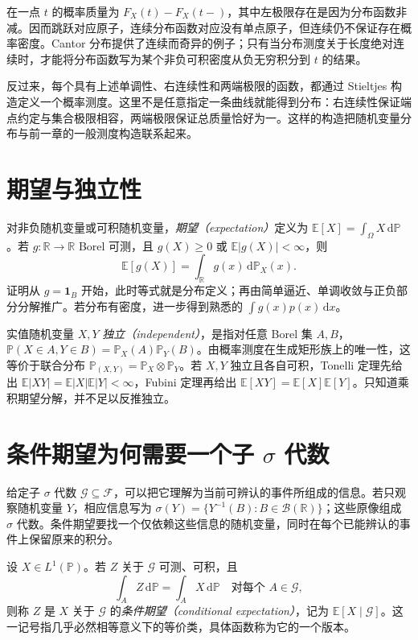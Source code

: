 在一点 $t$ 的概率质量为 $F_X(t)-F_X(t-)$，其中左极限存在是因为分布函数非减。因而跳跃对应原子，连续分布函数对应没有单点原子，但连续仍不保证存在概率密度。Cantor 分布提供了连续而奇异的例子；只有当分布测度关于长度绝对连续时，才能将分布函数写为某个非负可积密度从负无穷积分到 $t$ 的结果。

反过来，每个具有上述单调性、右连续性和两端极限的函数，都通过 Stieltjes 构造定义一个概率测度。这里不是任意指定一条曲线就能得到分布：右连续性保证端点约定与集合极限相容，两端极限保证总质量恰好为一。这样的构造把随机变量分布与前一章的一般测度构造联系起来。

\section{期望与独立性}
对非负随机变量或可积随机变量，\emph{期望（expectation）}定义为 $\mathbb E[X]=\int_\Omega X\,\mathrm d\mathbb P$。若 $g:\mathbb R\to\mathbb R$ Borel 可测，且 $g(X)\geq0$ 或 $\mathbb E|g(X)|<\infty$，则
\begin{equation}
 \mathbb E[g(X)]=\int_{\mathbb R}g(x)\,\mathrm d\mathbb P_X(x).
 \label{eq:mt-distribution-integral}
\end{equation}
证明从 $g=\mathbf1_B$ 开始，此时等式就是分布定义；再由简单逼近、单调收敛与正负部分分解推广。若分布有密度，进一步得到熟悉的 $\int g(x)p(x)\,\mathrm dx$。

实值随机变量 $X,Y$ \emph{独立（independent）}，是指对任意 Borel 集 $A,B$，
$\mathbb P(X\in A,Y\in B)=\mathbb P_X(A)\mathbb P_Y(B)$。由概率测度在生成矩形族上的唯一性，这等价于联合分布 $\mathbb P_{(X,Y)}=\mathbb P_X\otimes\mathbb P_Y$。若 $X,Y$ 独立且各自可积，Tonelli 定理先给出 $\mathbb E|XY|=\mathbb E|X|\mathbb E|Y|<\infty$，Fubini 定理再给出 $\mathbb E[XY]=\mathbb E[X]\mathbb E[Y]$。只知道乘积期望分解，并不足以反推独立。

\section{条件期望为何需要一个子 $\sigma$ 代数}
给定子 $\sigma$ 代数 $\mathcal G\subseteq\mathcal F$，可以把它理解为当前可辨认的事件所组成的信息。若只观察随机变量 $Y$，相应信息写为 $\sigma(Y)=\{Y^{-1}(B):B\in\mathcal B(\mathbb R)\}$；这些原像组成 $\sigma$ 代数。条件期望要找一个仅依赖这些信息的随机变量，同时在每个已能辨认的事件上保留原来的积分。

\begin{definition}
设 $X\in L^1(\mathbb P)$。若 $Z$ 关于 $\mathcal G$ 可测、可积，且
\begin{equation}
 \int_AZ\,\mathrm d\mathbb P=\int_AX\,\mathrm d\mathbb P
 \quad\text{对每个 }A\in\mathcal G,
 \label{eq:mt-conditional-expectation}
\end{equation}
则称 $Z$ 是 $X$ 关于 $\mathcal G$ 的\emph{条件期望（conditional expectation）}，记为 $\mathbb E[X\mid\mathcal G]$。这一记号指几乎必然相等意义下的等价类，具体函数称为它的一个版本。
\end{definition}

